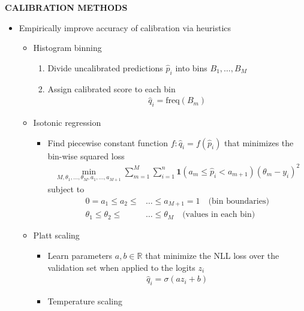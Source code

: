 \begin{whitebox}{\textbf{CALIBRATION METHODS}}
    \begin{itemize}
        \item Empirically improve accuracy of calibration via heuristics
        \begin{itemize}
            \item Histogram binning
            \begin{enumerate}
                \item Divide uncalibrated predictions $\hat{p}_i$ into bins $B_1,\dots,B_M$
                \item Assign calibrated score to each bin
                \begin{align*}
                    \hat{q}_i=\mathrm{freq}(B_m)
                \end{align*}
            \end{enumerate}
            \item Isotonic regression
            \begin{itemize}
                \item Find piecewise constant function $f:\hat{q}_i=f(\hat{p}_i)$ that minimizes the bin-wise squared loss
                \begin{align*}
                    \min_{M,\theta_1,\dots,\theta_M,a_1,\dots,a_{M+1}}\sum_{m=1}^M\sum_{i=1}^n\mathbf{1}(a_m\leq\hat{p}_i<a_{m+1})(\theta_m-y_i)^2
                \end{align*}
                subject to
                \begin{align*}
                    0=a_1\leq a_2\leq&\dots\leq a_{M+1}=1\quad\text{(bin boundaries)}\\
                    \theta_1\leq\theta_2\leq&\dots\leq\theta_M\quad\text{(values in each bin)}
                \end{align*}
            \end{itemize}
            \item Platt scaling
            \begin{itemize}
                \item Learn parameters $a,b\in\mathbb{R}$ that minimize the NLL loss over the validation set when applied to the logits $z_i$
                \begin{align*}
                    \hat{q}_i=\sigma(az_i+b)
                \end{align*}
                \item Temperature scaling
                \begin{align*}

\end{align*}
\end{itemize}
\end{itemize}
\end{itemize}
\end{whitebox}
